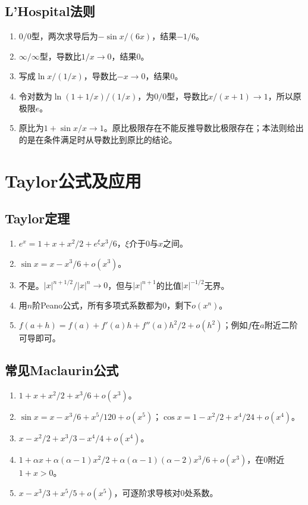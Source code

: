 \documentclass[11pt,a4paper,fontset=fandol]{ctexrep}
\begin{document}
\subsection{L'Hospital法则}
\begin{enumerate}
\item $0/0$型，两次求导后为$-\sin x/(6x)$，结果$-1/6$。
\item $\infty/\infty$型，导数比$1/x\to0$，结果0。
\item 写成$\ln x/(1/x)$，导数比$-x\to0$，结果0。
\item 令对数为$\ln(1+1/x)/(1/x)$，为$0/0$型，导数比$x/(x+1)\to1$，所以原极限$e$。
\item 原比为$1+\sin x/x\to1$。原比极限存在不能反推导数比极限存在；本法则给出的是在条件满足时从导数比到原比的结论。
\end{enumerate}
\section{Taylor公式及应用}
\subsection{Taylor定理}
\begin{enumerate}
\item $e^x=1+x+x^2/2+e^\xi x^3/6$，$\xi$介于0与$x$之间。
\item $\sin x=x-x^3/6+o(x^3)$。
\item 不是。$|x|^{n+1/2}/|x|^n\to0$，但与$|x|^{n+1}$的比值$|x|^{-1/2}$无界。
\item 用$n$阶Peano公式，所有多项式系数都为0，剩下$o(x^n)$。
\item $f(a+h)=f(a)+f'(a)h+f''(a)h^2/2+o(h^2)$；例如$f$在$a$附近二阶可导即可。
\end{enumerate}
\subsection{常见Maclaurin公式}
\begin{enumerate}
\item $1+x+x^2/2+x^3/6+o(x^3)$。
\item $\sin x=x-x^3/6+x^5/120+o(x^5)$；$\cos x=1-x^2/2+x^4/24+o(x^4)$。
\item $x-x^2/2+x^3/3-x^4/4+o(x^4)$。
\item $1+\alpha x+\alpha(\alpha-1)x^2/2+\alpha(\alpha-1)(\alpha-2)x^3/6+o(x^3)$，在0附近$1+x>0$。
\item $x-x^3/3+x^5/5+o(x^5)$，可逐阶求导核对0处系数。
\end{enumerate}
\end{document}
